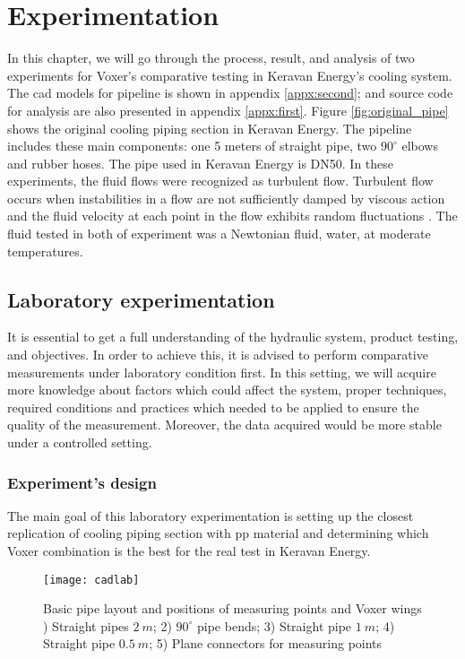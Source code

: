 
\chapter{Experimentation}

In this chapter, we will go through the process, result, and analysis of two experiments for Voxer's comparative testing in Keravan Energy's cooling system. The \gls{cad} models for pipeline is shown in appendix \ref{appx:second}; and source code for analysis are also presented in appendix \ref{appx:first}. Figure \vref{fig:original_pipe} shows the original cooling piping section in Keravan Energy. The pipeline includes these main components: one 5 meters of straight pipe, two $90^{\circ}$ elbows and rubber hoses. The pipe used in Keravan Energy is DN50. In these experiments, the fluid flows were recognized as turbulent flow. Turbulent flow occurs when instabilities in a flow are not sufficiently damped by viscous action and the fluid velocity at each point in the flow exhibits random fluctuations \cite{turbulent:article}. The fluid tested in both of experiment was a Newtonian fluid, water, at moderate temperatures.


\section{Laboratory experimentation}

It is essential to get a full understanding of the hydraulic system, product testing, and objectives. In order to achieve this, it is advised to perform comparative measurements under laboratory condition first. In this setting, we will acquire more knowledge about factors which could affect the system, proper techniques, required conditions and practices which needed to be applied to ensure the quality of the measurement. Moreover, the data acquired would be more stable under a controlled setting.

\subsection{Experiment's design}

The main goal of this laboratory experimentation is setting up the closest replication of cooling piping section with \gls{pp} material and determining which Voxer combination is the best for the real test in Keravan Energy. 
\begin{figure}[h]
  \centering
  \texttt{[image: cadlab]}
  \caption{ Basic pipe layout and positions of measuring points and Voxer wings ) Straight pipes $2\ m$; 2) $90^{\circ}$ pipe bends; 3) Straight pipe $1\ m$; 4) Straight pipe $0.5\ m$; 5) Plane connectors for measuring points}
  \label{fig:cadlab}
\end{figure}

